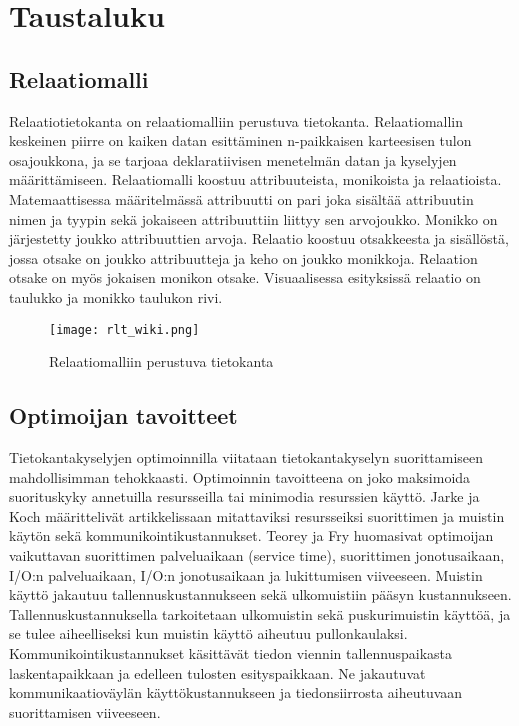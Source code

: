 \documentclass[finnish]{tktltiki2}
\theoremstyle{definition}
\theoremstyle{remark}
\begin{document}
\section{Taustaluku}
\subsection{Relaatiomalli}

Relaatiotietokanta on relaatiomalliin \cite{codd1970relational} perustuva tietokanta. Relaatiomallin keskeinen piirre on kaiken datan esittäminen n-paikkaisen karteesisen tulon osajoukkona, ja se tarjoaa deklaratiivisen menetelmän datan ja kyselyjen määrittämiseen. Relaatiomalli koostuu attribuuteista, monikoista ja relaatioista. Matemaattisessa määritelmässä attribuutti on pari joka sisältää attribuutin nimen ja tyypin sekä jokaiseen attribuuttiin liittyy sen arvojoukko. Monikko on järjestetty joukko attribuuttien arvoja. Relaatio koostuu otsakkeesta ja sisällöstä, jossa otsake on joukko attribuutteja ja keho on joukko monikkoja. Relaation otsake on myös jokaisen monikon otsake. Visuaalisessa esityksissä relaatio on taulukko ja monikko taulukon rivi. 

\begin{figure}[!h]
  \caption{Relaatiomalliin perustuva tietokanta}
  \centering
    \texttt{[image: rlt\_wiki.png]}
\end{figure}

\subsection{Optimoijan tavoitteet}
Tietokantakyselyjen optimoinnilla viitataan tietokantakyselyn suorittamiseen mahdollisimman tehokkaasti. Optimoinnin tavoitteena on joko maksimoida suorituskyky annetuilla resursseilla tai minimodia resurssien käyttö. Jarke ja Koch määrittelivät artikkelissaan \cite{jarke1984} mitattaviksi resursseiksi suorittimen ja muistin käytön sekä kommunikointikustannukset. Teorey ja Fry \cite{teorey1982design} huomasivat optimoijan vaikuttavan suorittimen palveluaikaan (service time), suorittimen jonotusaikaan, I/O:n palveluaikaan, I/O:n jonotusaikaan ja lukittumisen viiveeseen. Muistin käyttö jakautuu tallennuskustannukseen sekä ulkomuistiin pääsyn kustannukseen. Tallennuskustannuksella tarkoitetaan ulkomuistin sekä puskurimuistin käyttöä, ja se tulee aiheelliseksi kun muistin käyttö aiheutuu pullonkaulaksi. Kommunikointikustannukset käsittävät tiedon viennin tallennuspaikasta laskentapaikkaan ja edelleen tulosten esityspaikkaan. Ne jakautuvat kommunikaatioväylän käyttökustannukseen ja tiedonsiirrosta aiheutuvaan suorittamisen viiveeseen.
\end{document}
